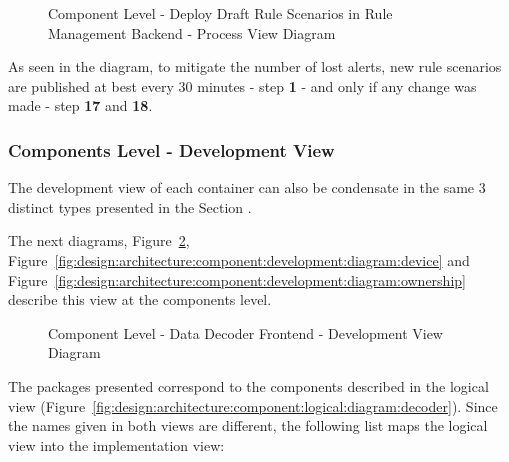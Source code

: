 \begin{figure}[H]
   \centering
   \resizebox{\columnwidth}{!}
   {
      
   }
   \caption[Component Level - Deploy Draft Rule Scenarios in Rule Management Backend - Process View Diagram]{Component Level - Deploy Draft Rule Scenarios in Rule Management Backend - Process View Diagram}
   \label{fig:design:architecture:component:process:diagram:rule}
\end{figure}

As seen in the diagram, to mitigate the number of lost alerts, new rule scenarios are published at best every 30 minutes - step \textbf{1} - and only if any change was made - step \textbf{17} and \textbf{18}.  

\subsubsection{Components Level - Development View}
\label{subsubsec:design:architecture:components:development}

The development view of each container can also be condensate in the same 3 distinct types presented in the Section .

The next diagrams, Figure~\ref{fig:design:architecture:component:development:diagram:decoder}, Figure~\ref{fig:design:architecture:component:development:diagram:device} and Figure~\ref{fig:design:architecture:component:development:diagram:ownership} describe this view at the components level.

\begin{figure}[H]
   \centering
   \resizebox{\columnwidth}{!}
   {
      
   }
   \caption[Component Level - Data Decoder Frontend - Development View Diagram]{Component Level - Data Decoder Frontend - Development View Diagram}
   \label{fig:design:architecture:component:development:diagram:decoder}
\end{figure}

The packages presented correspond to the components described in the logical view (Figure~\ref{fig:design:architecture:component:logical:diagram:decoder}). Since the names given in both views are different, the following list maps the logical view into the implementation view:

